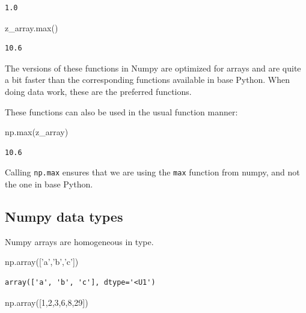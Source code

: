 \documentclass[
  letterpaper,
]{scrbook}
\newenvironment{Shaded}{\begin{snugshade}}{\end{snugshade}}
\newcommand{\BuiltInTok}[1]{#1}
\newcommand{\DecValTok}[1]{\textcolor[rgb]{0.00,0.00,0.81}{#1}}
\newcommand{\NormalTok}[1]{#1}
\newcommand{\StringTok}[1]{\textcolor[rgb]{0.31,0.60,0.02}{#1}}
\begin{document}
\begin{verbatim}
1.0
\end{verbatim}

\begin{Shaded}
\begin{Highlighting}[]
\NormalTok{z_array.}\BuiltInTok{max}\NormalTok{()}
\end{Highlighting}
\end{Shaded}

\begin{verbatim}
10.6
\end{verbatim}

The versions of these functions in Numpy are optimized for arrays and are quite a bit faster than the corresponding functions available in base Python. When doing data work, these are the preferred functions.

These functions can also be used in the usual function manner:

\begin{Shaded}
\begin{Highlighting}[]
\NormalTok{np.}\BuiltInTok{max}\NormalTok{(z_array)}
\end{Highlighting}
\end{Shaded}

\begin{verbatim}
10.6
\end{verbatim}

Calling \texttt{np.max} ensures that we are using the \texttt{max} function from numpy, and not the one in base Python.

\hypertarget{numpy-data-types}{%
\subsection{Numpy data types}\label{numpy-data-types}}

Numpy arrays are homogeneous in type.

\begin{Shaded}
\begin{Highlighting}[]
\NormalTok{np.array([}\StringTok{'a'}\NormalTok{,}\StringTok{'b'}\NormalTok{,}\StringTok{'c'}\NormalTok{])}
\end{Highlighting}
\end{Shaded}

\begin{verbatim}
array(['a', 'b', 'c'], dtype='<U1')
\end{verbatim}

\begin{Shaded}
\begin{Highlighting}[]
\NormalTok{np.array([}\DecValTok{1}\NormalTok{,}\DecValTok{2}\NormalTok{,}\DecValTok{3}\NormalTok{,}\DecValTok{6}\NormalTok{,}\DecValTok{8}\NormalTok{,}\DecValTok{29}\NormalTok{])}
\end{Highlighting}
\end{Shaded}
\end{document}
